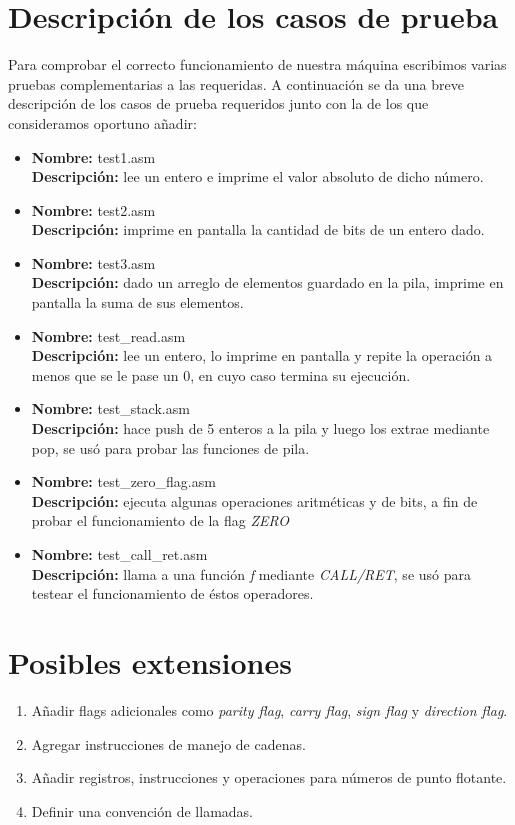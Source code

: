 \documentclass[a4paper,12pt]{article}
\begin{document}
\section{Descripci\'on de los casos de prueba}

Para comprobar el correcto funcionamiento de nuestra m\'aquina escribimos varias pruebas complementarias a las requeridas. A continuaci\'on se da una breve descripci\'on de los casos de prueba requeridos junto con la de los que consideramos oportuno añadir:
\begin{itemize}
\item
\textbf{Nombre:} test1.asm\\
\textbf{Descripci\'on:} lee un entero e imprime el valor absoluto de dicho n\'umero.
\item
\textbf{Nombre:} test2.asm\\
\textbf{Descripci\'on:} imprime en pantalla la cantidad de bits de un entero dado.
\item
\textbf{Nombre:} test3.asm\\
\textbf{Descripci\'on:} dado un arreglo de elementos guardado en la pila, imprime en pantalla la suma de sus elementos.
\item
\textbf{Nombre:} test\_read.asm\\
\textbf{Descripci\'on:} lee un entero, lo imprime en pantalla y repite la operaci\'on a menos que se le pase un 0, en cuyo caso termina su ejecuci\'on.
\item
\textbf{Nombre:} test\_stack.asm\\
\textbf{Descripci\'on:} hace push de 5 enteros a la pila y luego los extrae mediante pop, se us\'o para probar las funciones de pila.
\item
\textbf{Nombre:} test\_zero\_flag.asm\\
\textbf{Descripci\'on:} ejecuta algunas operaciones aritm\'eticas y de bits, a fin de probar el funcionamiento de la flag \emph{ZERO}
\item
\textbf{Nombre:} test\_call\_ret.asm\\
\textbf{Descripci\'on:} llama a una funci\'on \emph f mediante \emph{CALL/RET}, se us\'o para testear el funcionamiento de \'estos operadores.
\end{itemize}

\section{Posibles extensiones}

\begin{enumerate}
\item Añadir flags adicionales como \emph{parity flag}, \emph{carry flag}, \emph{sign flag} y \emph{direction flag}.
\item Agregar instrucciones de manejo de cadenas.
\item Añadir registros, instrucciones y operaciones para n\'umeros de punto flotante.
\item Definir una convenci\'on de llamadas.
\end{enumerate}
\end{document}
